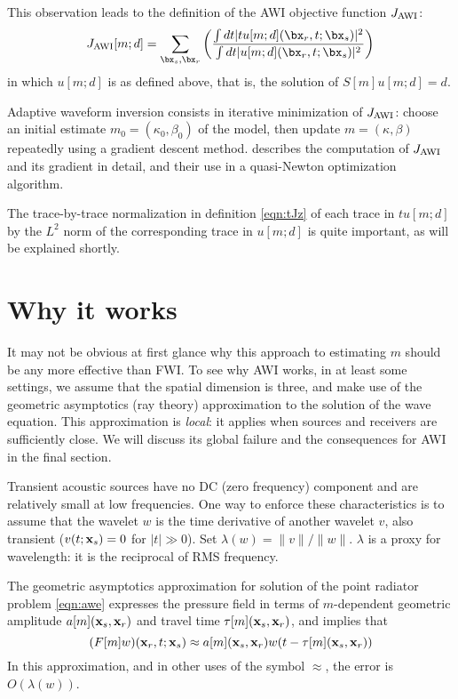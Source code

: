 This observation leads to the definition of the AWI objective function $J_{\rm AWI}$:
\begin{equation}
  \label{eqn:tJz}
  J_{\rm AWI}[m;d] = \sum_{\bx_s,\bx_r} \left(\frac{\int dt |tu[m;d](\bx_r,t;\bx_s)|^2}{\int dt |u[m;d](\bx_r,t;\bx_s)|^2}\right)
\end{equation}
in which $u[m;d]$ is as defined above, that is, the solution of $S[m]u[m;d]
= d$.

Adaptive waveform inversion consists in iterative minimization of
$J_{\rm AWI}$: choose an initial estimate $m_0=(\kappa_0,\beta_0)$ of the
model, then update $m=(\kappa,\beta)$ repeatedly using a gradient
descent method. \cite{Warner:16} describes the computation of $J_{\rm AWI}$
and its gradient in detail, and their use in a quasi-Newton
optimization algorithm.

The trace-by-trace normalization in definition \ref{eqn:tJz} of each
trace in $tu[m;d]$ by the
$L^2$ norm of the corresponding trace in $u[m;d]$ is quite important, as will be explained shortly.

\section{Why it works}

It may not be obvious at first glance why this approach to estimating
$m$ should be any more effective than FWI. To see why AWI works, in at
least some settings, we assume that the spatial dimension is three,
and make use of the geometric asymptotics (ray theory) approximation
to the solution of the wave equation. This approximation is {\em
  local}: it applies when sources and receivers are sufficiently
close. We will discuss its global failure and the consequences for AWI
in the final section.

Transient acoustic sources have no DC (zero frequency) component and
are relatively small at low frequencies. One way to enforce these
characteristics is to assume that the wavelet $w$ is the time
derivative of another wavelet $v$, also transient ($v(t;{\bf x}_s)=0$
for $|t| \gg 0$). Set $\lambda(w) = \|v\|/\|w\|$. $\lambda$ is a proxy for wavelength: it is the reciprocal of RMS frequency.

The geometric asymptotics approximation for solution of the point
radiator problem \ref{eqn:awe} expresses the pressure field in terms
of $m$-dependent geometric amplitude $a[m]({\bf x}_s,{\bf x}_r)$ and
travel time $\tau[m]({\bf x}_s,{\bf x}_r)$, and implies that
\begin{equation}
  \label{eqn:hadamard}
  (F[m]w)({\bf x}_r,t;{\bf x}_s) \approx a[m]({\bf x}_s,{\bf x}_r) w(t-\tau[m]({\bf x}_s,{\bf x}_r)) 
\end{equation}
In this approximation, and in other uses of the symbol $\approx$, the
error is $O(\lambda(w))$.

